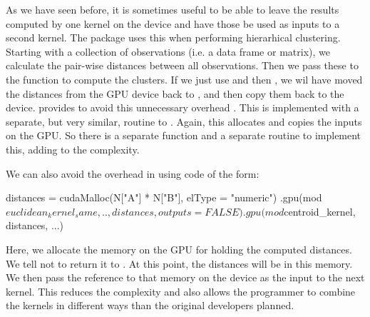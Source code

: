 As we have seen before, it is sometimes useful to be able to leave the
results computed by one kernel on the device and have those be used as
inputs to a second kernel.  The  package uses this when
performing hierarhical clustering.  Starting with a collection of
observations (i.e. a data frame or matrix), we calculate the pair-wise
distances between all observations.  Then we pass these to the
 function to compute the clusters.  If we just use
 and then , we wil have moved the
distances from the GPU device back to \R, and then copy them back to
the device.   provides  to avoid
this unnecessary overhead .  This is implemented with a separate, but
very similar, routine to .  Again, this allocates and
copies the inputs on the GPU.  So there is a separate \R{} function
and a separate \C{} routine to implement this, adding to the
complexity.

We can also avoid the overhead in  using 
code of the form:
\begin{RCode}
distances = cudaMalloc(N["A"] * N["B"], elType = "numeric")
.gpu(mod$euclidean_kernel_same, .., distances, outputs = FALSE)
.gpu(mod$centroid_kernel, distances, ...) 
\end{RCode}
Here, we allocate the memory on the GPU for holding the computed
distances. We tell  not to return it to \R.
At this point, the distances will be in this memory.
We then pass the reference to that memory on the device as the input
to the next kernel. 
This reduces the complexity and also allows the \R{} programmer
to combine the kernels in different ways than the original
developers planned.




